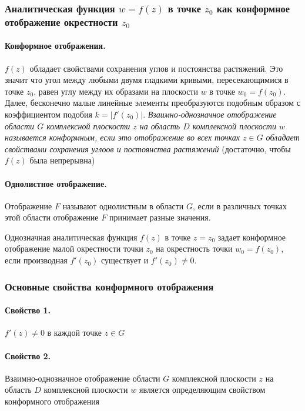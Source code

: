 \documentclass[12pt]{extarticle}
\begin{document}
\subsubsection{Аналитическая функция $w=f(z)$ в точке $z_{0}$ как
конформное отображение окрестности $z_{0}$}
\paragraph{Конформное отображения.}
$f(z)$ обладает свойствами сохранения углов и постоянства растяжений.
Это значит что угол между любыми двумя гладкими кривыми, пересекающимися
в точке $z_{0}$, равен углу между их образами на плоскости $w$ в точке
$w_{0}=f(z_{0})$. Далее, бесконечно малые линейные элементы
преобразуются подобным образом с коэффициентом подобия $k=|f'(z_{0})|$.
\textit{Взаимно-однозначное отображение области $G$ комплексной
плоскости $z$ на область $D$ комплексной плоскости $w$ называется
конформным, если это отображение во всех точках $z\in G$ обладает
свойствами сохранения углоов и постоянства растяжений} (достаточно,
чтобы $f(z)$ была непрерывна)
\paragraph{Однолистное отображение.}
Отображение $F$ называют однолистным в области $G$, если в различных
точках этой области отображение $F$ принимает разные значения.
\par Однозначная аналитическая функция $f(z)$ в точке $z=z_{0}$ задает
конформное отображение малой окрестности точки $z_{0}$ на окрестность
точки $w_{0}=f(z_{0})$, если производная $f'(z_{0})$ существует и
$f'(z_{0})\neq 0$.

\subsubsection{Основные свойства конформного отображения}
\paragraph{Свойство 1.} $f'(z)\neq 0$ в каждой точке $z\in G$
\paragraph{Свойство 2.} Взаимно-однозначное отображение области $G$
комплексной плоскости $z$ на область $D$ комплексной плоскости $w$
является определяющим свойством конформного отображения
\end{document}
